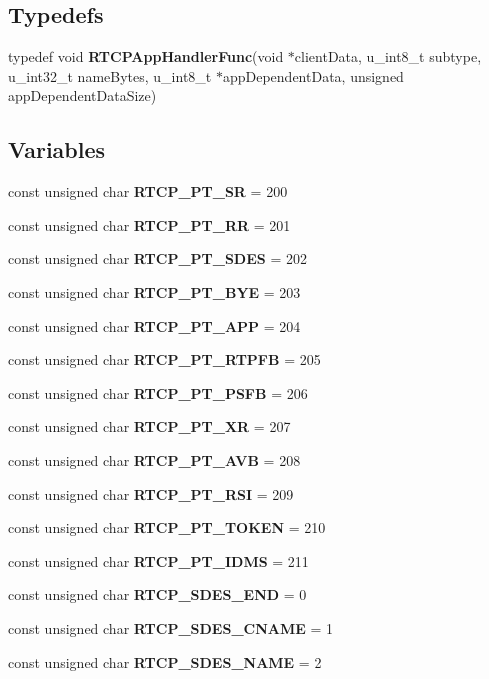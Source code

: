 \subsection*{Typedefs}
\begin{DoxyCompactItemize}
\item 
typedef void {\bf R\+T\+C\+P\+App\+Handler\+Func}(void $\ast$client\+Data, u\+\_\+int8\+\_\+t subtype, u\+\_\+int32\+\_\+t name\+Bytes, u\+\_\+int8\+\_\+t $\ast$app\+Dependent\+Data, unsigned app\+Dependent\+Data\+Size)
\end{DoxyCompactItemize}
\subsection*{Variables}
\begin{DoxyCompactItemize}
\item 
const unsigned char {\bf R\+T\+C\+P\+\_\+\+P\+T\+\_\+\+S\+R} = 200
\item 
const unsigned char {\bf R\+T\+C\+P\+\_\+\+P\+T\+\_\+\+R\+R} = 201
\item 
const unsigned char {\bf R\+T\+C\+P\+\_\+\+P\+T\+\_\+\+S\+D\+E\+S} = 202
\item 
const unsigned char {\bf R\+T\+C\+P\+\_\+\+P\+T\+\_\+\+B\+Y\+E} = 203
\item 
const unsigned char {\bf R\+T\+C\+P\+\_\+\+P\+T\+\_\+\+A\+P\+P} = 204
\item 
const unsigned char {\bf R\+T\+C\+P\+\_\+\+P\+T\+\_\+\+R\+T\+P\+F\+B} = 205
\item 
const unsigned char {\bf R\+T\+C\+P\+\_\+\+P\+T\+\_\+\+P\+S\+F\+B} = 206
\item 
const unsigned char {\bf R\+T\+C\+P\+\_\+\+P\+T\+\_\+\+X\+R} = 207
\item 
const unsigned char {\bf R\+T\+C\+P\+\_\+\+P\+T\+\_\+\+A\+V\+B} = 208
\item 
const unsigned char {\bf R\+T\+C\+P\+\_\+\+P\+T\+\_\+\+R\+S\+I} = 209
\item 
const unsigned char {\bf R\+T\+C\+P\+\_\+\+P\+T\+\_\+\+T\+O\+K\+E\+N} = 210
\item 
const unsigned char {\bf R\+T\+C\+P\+\_\+\+P\+T\+\_\+\+I\+D\+M\+S} = 211
\item 
const unsigned char {\bf R\+T\+C\+P\+\_\+\+S\+D\+E\+S\+\_\+\+E\+N\+D} = 0
\item 
const unsigned char {\bf R\+T\+C\+P\+\_\+\+S\+D\+E\+S\+\_\+\+C\+N\+A\+M\+E} = 1
\item 
const unsigned char {\bf R\+T\+C\+P\+\_\+\+S\+D\+E\+S\+\_\+\+N\+A\+M\+E} = 2

\end{DoxyCompactItemize}
